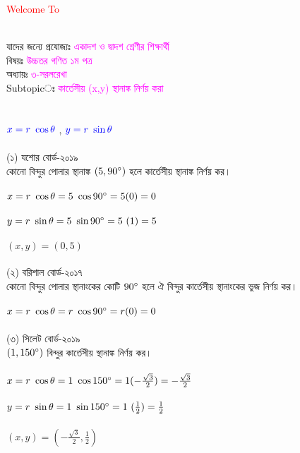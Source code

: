 \documentclass{article}
\begin{document}
 
	\Large
	\textcolor{red}{Welcome To} 
	\\
	\\
	যাদের জন্যে প্রযোজ্যঃ  	\textcolor{magenta}{একাদশ ও দ্বাদশ শ্রেণীর শিক্ষার্থী} \\
	বিষয়ঃ \textcolor{magenta}{উচ্চতর গণিত ১ম পত্র} \\
	অধ্যায়ঃ \textcolor{magenta}{৩-সরলরেখা}\\ 
	Subtopicঃ  \textcolor{magenta}{ কার্তেসীয় (x,y)  স্থানাঙ্ক নির্ণয় করা }\\
	\\
	\\
	$\textcolor{blue}{x=r\,\,\cos \theta}$ , $\textcolor{blue}{y=r\,\,\sin \theta}$ \\
	\\
	(১) যশোর বোর্ড-২০১৯\\
	কোনো বিন্দুর পোলার স্থানাঙ্ক $(5,90\degree)$ হলে কার্তেসীয় স্থানাঙ্ক নির্ণয় কর। \\
	\\
	$x=r\,\,\cos \theta= 5\,\,\cos 90\degree= 5 (0)=0$\\
	\\
	$y=r\,\,\sin \theta= 5\,\,\sin 90\degree= 5\,\,(1)=5$\\
	\\
	$(x,y)=(0,5)$\\
	\\ 
	(২) বরিশাল বোর্ড-২০১৭\\
	কোনো বিন্দুর পোলার স্থানাংকের কোটি $90\degree$ হলে ঐ বিন্দুর কার্তেসীয় স্থানাংকের ভুজ নির্ণয় কর।\\
	\\
		$x=r\,\,\cos \theta= r\,\,\cos 90\degree= r (0)=0$\\
		\\
	(৩) সিলেট বোর্ড-২০১৯\\
	$(1,150\degree)$ বিন্দুর কার্তেসীয় স্থানাঙ্ক নির্ণয় কর।\\ 
	\\
		$x=r\,\,\cos \theta= 1\,\,\cos 150\degree= 1 (-\frac{\sqrt{3}}{2})=-\frac{\sqrt{3}}{2}$\\
	\\
	$y=r\,\,\sin \theta= 1\,\,\sin 150\degree= 1\,\,(\frac{1}{2})=\frac{1}{2}$\\
	\\
	$(x,y)=(-\frac{\sqrt{3}}{2},\frac{1}{2})$\\
\end{document}
